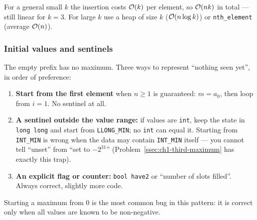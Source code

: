 \begin{diagrambox}
\end{diagrambox}

For a general small $k$ the insertion costs $\mathcal{O}(k)$ per element, so $\mathcal{O}(nk)$ in total --- still linear for $k = 3$. For large $k$ use a heap of size $k$ ($\mathcal{O}(n \log k)$) or \texttt{nth\_element} (average $\mathcal{O}(n)$).

\subsubsection*{Initial values and sentinels}

The empty prefix has no maximum. Three ways to represent ``nothing seen yet'', in order of preference:
\begin{enumerate}[leftmargin=*]
    \item \textbf{Start from the first element} when $n \ge 1$ is guaranteed: $m = a_0$, then loop from $i = 1$. No sentinel at all.
    \item \textbf{A sentinel outside the value range:} if values are \texttt{int}, keep the state in \texttt{long long} and start from \texttt{LLONG\_MIN}; no \texttt{int} can equal it. Starting from \texttt{INT\_MIN} is wrong when the data may contain \texttt{INT\_MIN} itself --- you cannot tell ``unset'' from ``set to $-2^{31}$'' (Problem~\ref{ssec:ch1-third-maximum} has exactly this trap).
    \item \textbf{An explicit flag or counter:} \texttt{bool have2} or ``number of slots filled''. Always correct, slightly more code.
\end{enumerate}
Starting a maximum from $0$ is the most common bug in this pattern: it is correct only when all values are known to be non-negative.

